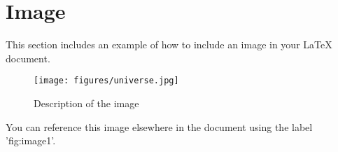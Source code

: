 \section{Image}
\label{sec:image} 

This section includes an example of how to include an image in your LaTeX document.

\begin{figure}[ht]
\centering
\texttt{[image: figures/universe.jpg]} %
\caption{Description of the image} %
\label{fig:image1} %
\end{figure}

You can reference this image elsewhere in the document using the label 'fig:image1'.
